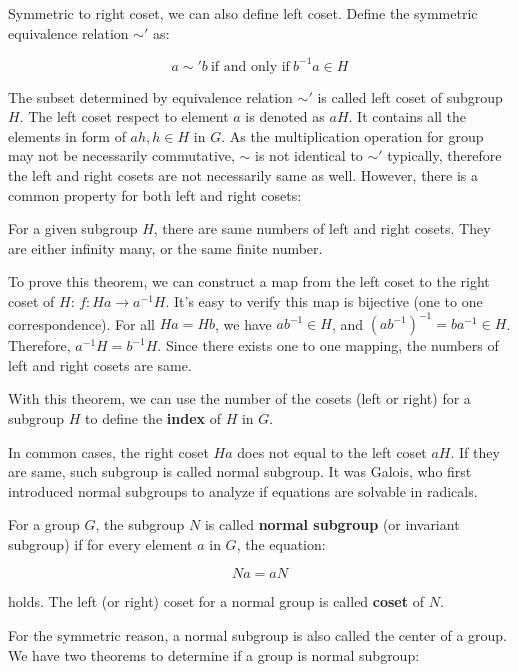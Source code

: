 \documentclass[b5paper]{article}
\begin{document}
Symmetric to right coset, we can also define left coset. Define the symmetric equivalence relation $\sim'$ as:

\[
a \sim' b\ \text{if and only if}\ b^{-1}a \in H
\]

The subset determined by equivalence relation $\sim'$ is called left coset of subgroup $H$. The left coset respect to element $a$ is denoted as $aH$. It contains all the elements in form of $ah, h \in H$ in $G$. As the multiplication operation for group may not be necessarily commutative, $\sim$ is not identical to $\sim'$ typically, therefore the left and right cosets are not necessarily same as well. However, there is a common property for both left and right cosets:

\begin{theorem}
For a given subgroup $H$, there are same numbers of left and right cosets. They are either infinity many, or the same finite number.
\end{theorem}

To prove this theorem, we can construct a map from the left coset to the right coset of $H$: $f: Ha \to a^{-1}H$. It's easy to verify this map is bijective (one to one correspondence). For all $Ha = Hb$, we have $ab^{-1} \in H$, and $(ab^{-1})^{-1} = ba^{-1} \in H$. Therefore, $a^{-1}H= b^{-1}H$. Since there exists one to one mapping, the numbers of left and right cosets are same.

With this theorem, we can use the number of the cosets (left or right) for a subgroup $H$ to define the \textbf{index} of $H$ in $G$.

In common cases, the right coset $Ha$ does not equal to the left coset $aH$. If they are same, such subgroup is called normal subgroup. It was Galois, who first introduced normal subgroups to analyze if equations are solvable in radicals.

 
\begin{definition}
For a group $G$, the subgroup $N$ is called \textbf{normal subgroup} (or invariant subgroup) if for every element $a$ in $G$, the equation:

\[
Na = aN
\]

holds. The left (or right) coset for a normal group is called \textbf{coset} of $N$.
\label{normal-subgroup}
\end{definition}

For the symmetric reason, a normal subgroup is also called the center of a group. We have two theorems to determine if a group is normal subgroup:
\end{document}
